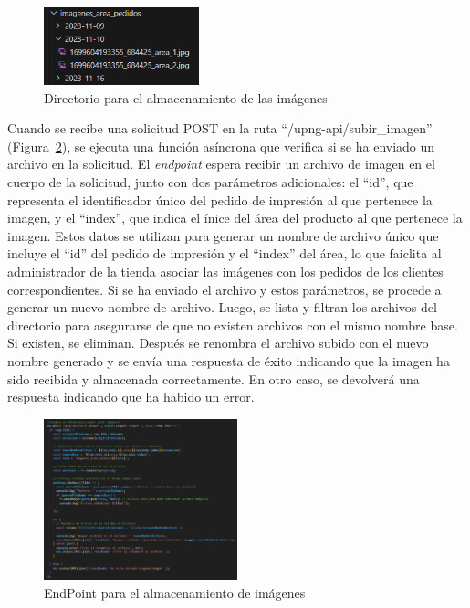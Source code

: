 \documentclass[11pt]{article}
\begin{document}
\begin{figure}[H]
    \centering
    \includegraphics[width=0.4\textwidth]{imagenes-back/almacenamientoCarpetaImagenes.png}
    \caption{\label{fig:carpetaImagenes} Directorio para el almacenamiento de las imágenes }
    \vspace{\fill}
\end{figure}

Cuando se recibe una solicitud POST en la ruta ``/upng-api/subir\_imagen'' (Figura~\ref{fig:endpointImagen}), se ejecuta una función asíncrona que verifica si se ha enviado
un archivo en la solicitud. El \textit{endpoint} espera recibir un archivo de imagen en el cuerpo de la solicitud, junto con dos parámetros adicionales: el ``id'', que 
representa el identificador único del pedido de impresión al que pertenece la imagen, y el ``index'', que indica el ínice del área del producto al 
que pertenece la imagen. Estos datos se utilizan para generar un nombre de archivo único que incluye el ``id'' del pedido de impresión y el ``index'' del área,
lo que faiclita al administrador de la tienda asociar las imágenes con los pedidos de los clientes correspondientes. Si se ha enviado el archivo y estos parámetros, se procede a generar un nuevo nombre de archivo. Luego, se lista y filtran los archivos del directorio para asegurarse de que no existen
archivos con el mismo nombre base. Si existen, se eliminan. Después se renombra el archivo subido con el nuevo nombre generado y se envía una respuesta de éxito indicando
que la imagen ha sido recibida y almacenada correctamente. En otro caso, se devolverá una respuesta indicando que ha habido un error. 


\begin{figure}[H]
    \centering
    \includegraphics[width=0.5\textwidth]{imagenes-back/endpointSubirImagen.png}
    \caption{\label{fig:endpointImagen} EndPoint para el almacenamiento de imágenes }
    \vspace{\fill}
\end{figure}
\end{document}
